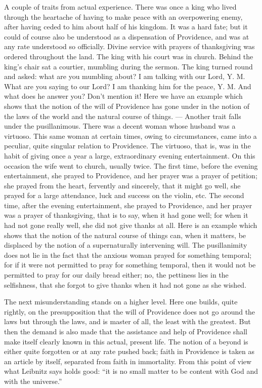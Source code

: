 \documentclass[12pt,a4paper,openany]{book}
\newcommand{\opage}[1]{\marginnote{\footnotesize\textit{[#1]}}}
\begin{document}
A couple of traits from actual experience. There was once a king who lived through the heartache of having to make
peace with an overpowering enemy, after having ceded to him about half of his kingdom. It was a hard fate; but it
could of course also be understood as a dispensation of Providence, and was at any rate understood so officially.
Divine service with prayers of thanksgiving was ordered throughout the land. The king with his court was in church.
Behind the king's chair sat a courtier, mumbling during the sermon. The king turned round and asked: what are you
mumbling about? I am talking with our Lord, Y. M. What are you saying to our Lord? I am thanking him for the peace,
Y. M. And what does he answer you? Don't mention it! Here we have an example which shows that the notion of the will
of Providence has gone under in the notion of the laws of the world and the natural course of things. --- Another
trait falls under the pusillanimous. There was a decent woman whose husband was a virtuoso. This same woman at certain
times, owing to circumstances, came into a peculiar, quite
\setcounter{footnote}{0}%
\opage{57}singular relation to Providence. The virtuoso, that is, was in the habit of giving once a year a large,
extraordinary evening entertainment. On this occasion the wife went to church, usually twice. The first time, before
the evening entertainment, she prayed to Providence, and her prayer was a prayer of petition; she prayed from the
heart, fervently and sincerely, that it might go well, she prayed for a large attendance, luck and success on the
violin, etc. The second time, after the evening entertainment, she prayed to Providence, and her prayer was a prayer
of thanksgiving, that is to say, when it had gone well; for when it had not gone really well, she did not give thanks
at all. Here is an example which shows that the notion of the natural course of things can, when it matters, be
displaced by the notion of a supernaturally intervening will. The pusillanimity does not lie in the fact that the
anxious woman prayed for something temporal; for if it were not permitted to pray for something temporal, then it
would not be permitted to pray for our daily bread either; no, the pettiness lies in the selfishness, that she forgot
to give thanks when it had not gone as she wished.

The next misunderstanding stands on a higher level. Here one builds, quite rightly, on the presupposition that the will
of Providence does not go around the laws but through the laws, and is master of all, the least with the greatest.
But then the demand is also made that the assistance and help of Providence shall make itself clearly known in this
actual, present life. The notion of a beyond is either quite forgotten or at any rate pushed back; faith in Providence
is taken as an article by itself, separated from faith in immortality. From this point of view
\setcounter{footnote}{0}%
\opage{58}what Leibnitz says holds good: ``it is no small matter to be content with God and with the universe.''
\end{document}
